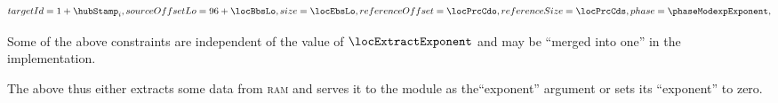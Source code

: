 \begin{description}
\begin{description}
\begin{enumerate}
\[{								targetId        = 1 + \hubStamp_{i}                         ,
								sourceOffsetLo  = 96 + \locBbsLo                            ,
								size            = \locEbsLo                                 ,
								referenceOffset = \locPrcCdo                                ,
								referenceSize   = \locPrcCds                                ,
								phase           = \phaseModexpExponent                      ,
							}
						\]
				\end{enumerate}
				\saNote{}
				Some of the above constraints are independent of the value of $\locExtractExponent$ and may be ``merged into one'' in the implementation.
		\end{description}
\end{description}
The above thus either extracts some data from \textsc{ram} and serves it to the \modexpMod{} module as the``exponent'' argument or sets its ``exponent'' to zero.
